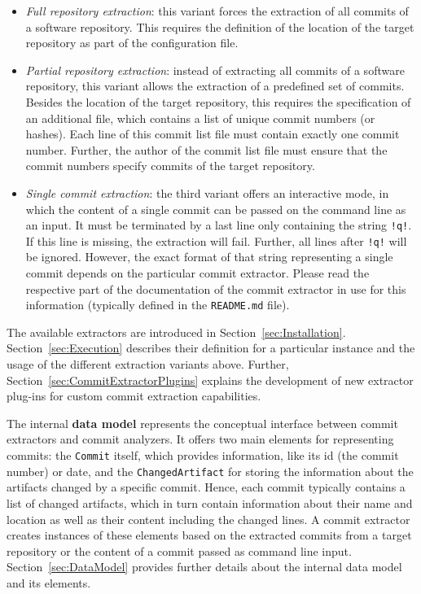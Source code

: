 \begin{itemize}
\item \textit{Full repository extraction}: this variant forces the extraction of all commits of a software repository. This requires the definition of the location of the target repository as part of the configuration file.
\item \textit{Partial repository extraction}: instead of extracting all commits of a software repository, this variant allows the extraction of a predefined set of commits. Besides the location of the target repository, this requires the specification of an additional file, which contains a list of unique commit numbers (or hashes). Each line of this commit list file must contain exactly one commit number. Further, the author of the commit list file must ensure that the commit numbers specify commits of the target repository.
\item \textit{Single commit extraction}: the third variant offers an interactive mode, in which the content of a single commit can be passed on the command line as an input. It must be terminated by a last line only containing the string \texttt{!q!}. If this line is missing, the extraction will fail. Further, all lines after \texttt{!q!} will be ignored. However, the exact format of that string representing a single commit depends on the particular commit extractor. Please read the respective part of the documentation of the commit extractor in use for this information (typically defined in the \texttt{README.md} file). 
\end{itemize}

The available extractors are introduced in Section~\ref{sec:Installation}. Section~\ref{sec:Execution} describes their definition for a particular \thetool{} instance and the usage of the different extraction variants above. Further, Section~\ref{sec:CommitExtractorPlugins} explains the development of new extractor plug-ins for custom commit extraction capabilities.

The internal \textbf{data model} represents the conceptual interface between commit extractors and commit analyzers. It offers two main elements for representing commits: the \texttt{Commit} itself, which provides information, like its id (the commit number) or date, and the \texttt{ChangedArtifact} for storing the information about the artifacts changed by a specific commit. Hence, each commit typically contains a list of changed artifacts, which in turn contain information about their name and location as well as their content including the changed lines. A commit extractor creates instances of these elements based on the extracted commits from a target repository or the content of a commit passed as command line input. Section~\ref{sec:DataModel} provides further details about the internal data model and its elements.

